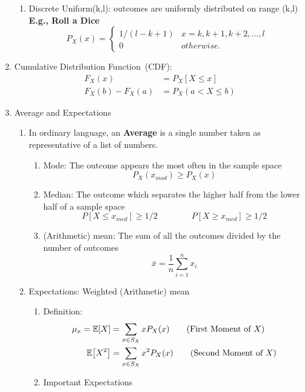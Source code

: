 \begin{enumerate}
{\begin{enumerate}
{            }
            \item Discrete Uniform(k,l): outcomes are uniformly distributed on range (k,l) \textbf{E.g., Roll a Dice}{
                \[ P_X(x) = 
                \begin{cases}
                    1/(l-k+1)   & x=k,k+1,k+2,\ldots,l \\
                    0   & otherwise.
                \end{cases} \]
            }            
        \end{enumerate}
    }
    \item Cumulative Distribution Function~(CDF): {
        \begin{align*}
            F_X(x)&=P_X[X\leq x] \\
            F_X(b)-F_X(a)&=P_X(a<X\leq b)
        \end{align*}
    }
    \item Average and Expectations{
        \begin{enumerate}
            \item In ordinary language, an \textbf{Average} is a single number taken as representative of a list of numbers.{
            \begin{enumerate}
                \item Mode: The outcome appears the most often in the sample space $$P_X(x_{mod})\geq P_X(x)$$
                \item Median: The outcome which separates the higher half from  the lower half of a sample space $$P[X\leq x_{med}]\geq 1/2 \qquad \qquad P[X\geq x_{med}]\geq 1/2$$
                \item (Arithmetic) mean:  The sum of all the outcomes divided by the number of outcomes $$\bar{x} = \frac{1}{n}\sum_{i=1}^{n}x_i$$
            \end{enumerate}
            }
            \item Expectations: Weighted (Arithmetic) mean{
                \begin{enumerate}
                    \item Definition:{
                        \begin{align}
                            \mu_x = \E{X}&=\sum_{x\in S_X}xP_X(x) \tag{First Moment of $X$}\\
                            \E{X^2}&=\sum_{x\in S_X}x^2P_X(x) \tag{Second Moment of $X$}
                        \end{align}
                    }
                    \item Important Expectations{
}
\end{enumerate}}
\end{enumerate}}
\end{enumerate}
